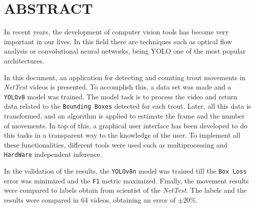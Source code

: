\section*{ABSTRACT}
\thispagestyle{abstract}
In recent years, the development of computer vision tools has become very important in our lives. In this field there are techniques such as optical flow analysis or 
convolutional neural networks, being YOLO one of the most popular architectures.

In this document, an application for detecting and counting trout movements in \textit{NetTest} videos is presented. To accomplish this, a data set was made and 
a \texttt{YOLOv8} model was trained. The model task is to process the video and return data related to the \texttt{Bounding Boxes} detected for each trout.\newline
Later, all this data is transformed, and an algorithm is applied to estimate the frame and the number of movements. In top of this, a graphical user interface has been 
developed to do this tasks in a transparent way to the knowledge of the user. To implement all these functionalities, different tools were used such as multiprocessing 
and \texttt{HardWare} independent inference.

In the validation of the results, the \texttt{YOLOv8n} model was trained till the \texttt{Box Loss} error was minimized and the \texttt{F1} metric maximized. Finally, 
the movement results were compared to labels obtain from scientist of the \textit{NetTest}. The labels and the results were compared in 64 videos, obtaining an error 
of \texttt{$ \pm 20\% $}.
